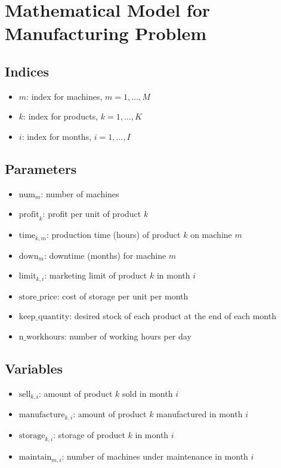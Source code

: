\documentclass{article}
\begin{document}
\section*{Mathematical Model for Manufacturing Problem}

\subsection*{Indices}
\begin{itemize}
    \item \( m \): index for machines, \( m = 1, \ldots, M \)
    \item \( k \): index for products, \( k = 1, \ldots, K \)
    \item \( i \): index for months, \( i = 1, \ldots, I \)
\end{itemize}

\subsection*{Parameters}
\begin{itemize}
    \item \( \text{num}_{m} \): number of machines
    \item \( \text{profit}_{k} \): profit per unit of product \( k \)
    \item \( \text{time}_{k,m} \): production time (hours) of product \( k \) on machine \( m \)
    \item \( \text{down}_{m} \): downtime (months) for machine \( m \)
    \item \( \text{limit}_{k,i} \): marketing limit of product \( k \) in month \( i \)
    \item \( \text{store\_price} \): cost of storage per unit per month
    \item \( \text{keep\_quantity} \): desired stock of each product at the end of each month
    \item \( \text{n\_workhours} \): number of working hours per day
\end{itemize}

\subsection*{Variables}
\begin{itemize}
    \item \( \text{sell}_{k,i} \): amount of product \( k \) sold in month \( i \)
    \item \( \text{manufacture}_{k,i} \): amount of product \( k \) manufactured in month \( i \)
    \item \( \text{storage}_{k,i} \): storage of product \( k \) in month \( i \)
    \item \( \text{maintain}_{m,i} \): number of machines under maintenance in month \( i \)
\end{itemize}
\end{document}

